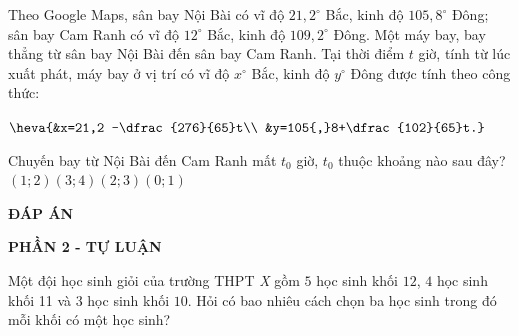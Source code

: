 \begin{ex}%
Theo Google Maps, sân bay Nội Bài có vĩ độ $21{,}2^{\circ}$ Bắc, kinh độ $105{,}8^{\circ}$ Đông; sân bay Cam Ranh có vĩ độ $12^{\circ}$ Bắc, kinh độ $109{,}2^{\circ}$  Đông. Một máy bay, bay thẳng từ sân bay Nội Bài đến sân bay Cam Ranh. Tại thời điểm $t$ giờ, tính từ lúc xuất phát, máy bay ở vị trí có vĩ độ $x^\circ$  Bắc, kinh độ $y^\circ$ Đông được tính theo công thức:
\begin{center}
	$\heva{&x=21,2 -\dfrac{276}{65}t\\
		&y=105{,}8+\dfrac{102}{65}t.}$
\end{center}
Chuyến bay từ Nội Bài đến Cam Ranh mất $t_{0}$ giờ, $t_{0}$ thuộc khoảng nào sau đây?
	\choice
	{$(1;2)$}{$(3;4)$}{\True $(2;3)$}{$(0;1)$}
\end{ex}



\begin{center}
	\textbf{ĐÁP ÁN}
\end{center}
\begin{center}
	\textbf{PHẦN 2 - TỰ LUẬN}
\end{center}

\begin{ex}%
Một đội học sinh giỏi của trường THPT \textit{X} gồm $5$ học sinh khối $12$, $4$ học sinh khối 11 và $3$ học sinh khối $10$. Hỏi có bao nhiêu cách chọn ba học sinh trong đó mỗi khối có một học sinh?
\end{ex}

